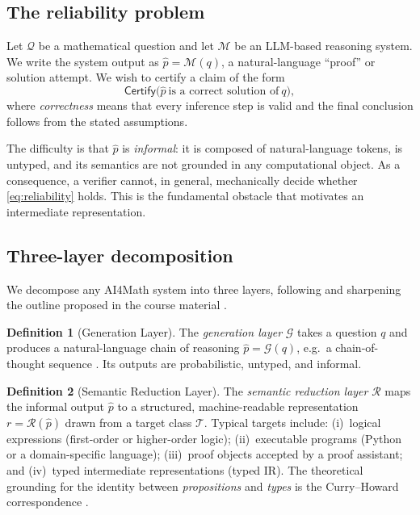 \documentclass[11pt,a4paper]{article}
\theoremstyle{definition}
\newtheorem{definition}{Definition}[section]
\theoremstyle{plain}
\begin{document}
\subsection{The reliability problem}
\label{sec:problem}

Let $\mathcal{Q}$ be a mathematical question and let $\mathcal{M}$ be an LLM-based reasoning system.
We write the system output as $\hat{p} = \mathcal{M}(q)$, a natural-language ``proof'' or solution
attempt. We wish to certify a claim of the form
\begin{equation}
  \label{eq:reliability}
  \mathsf{Certify}\big(\hat{p}\ \text{is a correct solution of}\ q\big),
\end{equation}
where \emph{correctness} means that every inference step is valid and the final conclusion follows from
the stated assumptions.

The difficulty is that $\hat{p}$ is \emph{informal}: it is composed of natural-language tokens, is
untyped, and its semantics are not grounded in any computational object. As a consequence, a verifier
cannot, in general, mechanically decide whether \eqref{eq:reliability} holds. This is the fundamental
obstacle that motivates an intermediate representation.

\subsection{Three-layer decomposition}
\label{sec:threelayer}

We decompose any AI4Math system into three layers, following and sharpening the outline proposed in the
course material \cite{chen2025reshaping}.

\begin{definition}[Generation Layer]
The \emph{generation layer} $\mathcal{G}$ takes a question $q$ and produces a natural-language chain of
reasoning $\hat{p} = \mathcal{G}(q)$, e.g.\ a chain-of-thought sequence \cite{wei2022}. Its outputs are
probabilistic, untyped, and informal.
\end{definition}

\begin{definition}[Semantic Reduction Layer]
The \emph{semantic reduction layer} $\mathcal{R}$ maps the informal output $\hat{p}$ to a structured,
machine-readable representation $r = \mathcal{R}(\hat{p})$ drawn from a target class
$\mathcal{T}$. Typical targets include: (i)~logical expressions (first-order or higher-order logic);
(ii)~executable programs (Python or a domain-specific language); (iii)~proof objects accepted by a proof
assistant; and (iv)~typed intermediate representations (typed IR). The theoretical grounding for the
identity between \emph{propositions} and \emph{types} is the Curry--Howard correspondence
\cite{howard1980}.
\end{definition}
\end{document}
